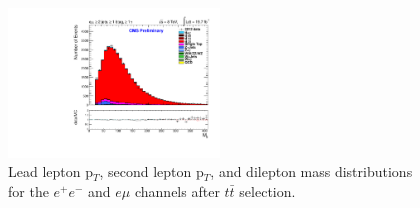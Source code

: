 \documentclass[oneside, a4paper, 11pt, ]{report}
\begin{document}
\begin{figure}
\includegraphics[width=0.5\textwidth]{Plots/ControlPlots/TTbarDiLeptonAnalysis/EMu/DiLepton/diLepton_Mass_splitTTbar_ratio.pdf}
\caption{Lead lepton p$_T$, second lepton p$_T$, and dilepton mass distributions for the $e^{+}e^{-}$ and $e\mu$ channels after $t\bar{t}$ selection.}
\label{fig-leptonLeadPtSecondPtAndMass}
\end{figure}
\end{document}
